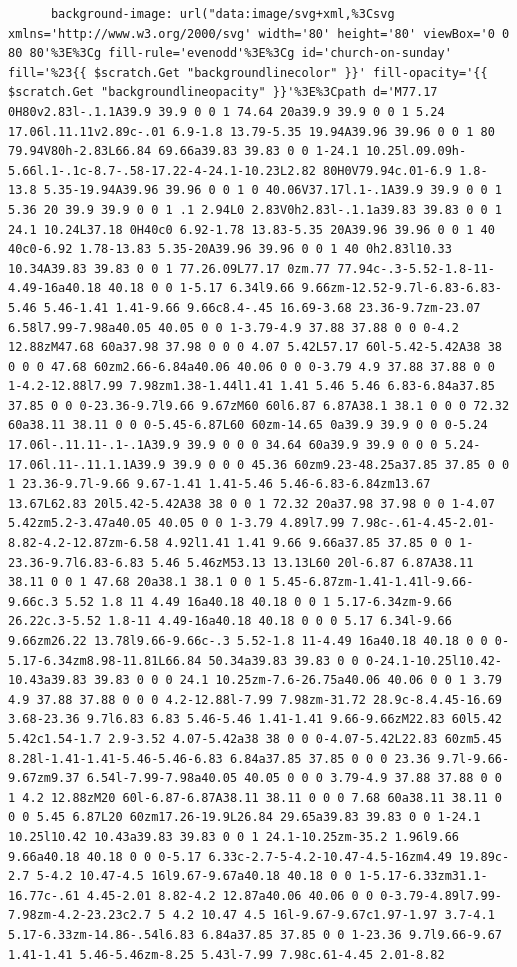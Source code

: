 \documentclass[11pt]{article}
\begin{document}
\begin{enumerate}
\begin{verbatim}
      background-image: url("data:image/svg+xml,%3Csvg xmlns='http://www.w3.org/2000/svg' width='80' height='80' viewBox='0 0 80 80'%3E%3Cg fill-rule='evenodd'%3E%3Cg id='church-on-sunday' fill='%23{{ $scratch.Get "backgroundlinecolor" }}' fill-opacity='{{ $scratch.Get "backgroundlineopacity" }}'%3E%3Cpath d='M77.17 0H80v2.83l-.1.1A39.9 39.9 0 0 1 74.64 20a39.9 39.9 0 0 1 5.24 17.06l.11.11v2.89c-.01 6.9-1.8 13.79-5.35 19.94A39.96 39.96 0 0 1 80 79.94V80h-2.83L66.84 69.66a39.83 39.83 0 0 1-24.1 10.25l.09.09h-5.66l.1-.1c-8.7-.58-17.22-4-24.1-10.23L2.82 80H0V79.94c.01-6.9 1.8-13.8 5.35-19.94A39.96 39.96 0 0 1 0 40.06V37.17l.1-.1A39.9 39.9 0 0 1 5.36 20 39.9 39.9 0 0 1 .1 2.94L0 2.83V0h2.83l-.1.1a39.83 39.83 0 0 1 24.1 10.24L37.18 0H40c0 6.92-1.78 13.83-5.35 20A39.96 39.96 0 0 1 40 40c0-6.92 1.78-13.83 5.35-20A39.96 39.96 0 0 1 40 0h2.83l10.33 10.34A39.83 39.83 0 0 1 77.26.09L77.17 0zm.77 77.94c-.3-5.52-1.8-11-4.49-16a40.18 40.18 0 0 1-5.17 6.34l9.66 9.66zm-12.52-9.7l-6.83-6.83-5.46 5.46-1.41 1.41-9.66 9.66c8.4-.45 16.69-3.68 23.36-9.7zm-23.07 6.58l7.99-7.98a40.05 40.05 0 0 1-3.79-4.9 37.88 37.88 0 0 0-4.2 12.88zM47.68 60a37.98 37.98 0 0 0 4.07 5.42L57.17 60l-5.42-5.42A38 38 0 0 0 47.68 60zm2.66-6.84a40.06 40.06 0 0 0-3.79 4.9 37.88 37.88 0 0 1-4.2-12.88l7.99 7.98zm1.38-1.44l1.41 1.41 5.46 5.46 6.83-6.84a37.85 37.85 0 0 0-23.36-9.7l9.66 9.67zM60 60l6.87 6.87A38.1 38.1 0 0 0 72.32 60a38.11 38.11 0 0 0-5.45-6.87L60 60zm-14.65 0a39.9 39.9 0 0 0-5.24 17.06l-.11.11-.1-.1A39.9 39.9 0 0 0 34.64 60a39.9 39.9 0 0 0 5.24-17.06l.11-.11.1.1A39.9 39.9 0 0 0 45.36 60zm9.23-48.25a37.85 37.85 0 0 1 23.36-9.7l-9.66 9.67-1.41 1.41-5.46 5.46-6.83-6.84zm13.67 13.67L62.83 20l5.42-5.42A38 38 0 0 1 72.32 20a37.98 37.98 0 0 1-4.07 5.42zm5.2-3.47a40.05 40.05 0 0 1-3.79 4.89l7.99 7.98c-.61-4.45-2.01-8.82-4.2-12.87zm-6.58 4.92l1.41 1.41 9.66 9.66a37.85 37.85 0 0 1-23.36-9.7l6.83-6.83 5.46 5.46zM53.13 13.13L60 20l-6.87 6.87A38.11 38.11 0 0 1 47.68 20a38.1 38.1 0 0 1 5.45-6.87zm-1.41-1.41l-9.66-9.66c.3 5.52 1.8 11 4.49 16a40.18 40.18 0 0 1 5.17-6.34zm-9.66 26.22c.3-5.52 1.8-11 4.49-16a40.18 40.18 0 0 0 5.17 6.34l-9.66 9.66zm26.22 13.78l9.66-9.66c-.3 5.52-1.8 11-4.49 16a40.18 40.18 0 0 0-5.17-6.34zm8.98-11.81L66.84 50.34a39.83 39.83 0 0 0-24.1-10.25l10.42-10.43a39.83 39.83 0 0 0 24.1 10.25zm-7.6-26.75a40.06 40.06 0 0 1 3.79 4.9 37.88 37.88 0 0 0 4.2-12.88l-7.99 7.98zm-31.72 28.9c-8.4.45-16.69 3.68-23.36 9.7l6.83 6.83 5.46-5.46 1.41-1.41 9.66-9.66zM22.83 60l5.42 5.42c1.54-1.7 2.9-3.52 4.07-5.42a38 38 0 0 0-4.07-5.42L22.83 60zm5.45 8.28l-1.41-1.41-5.46-5.46-6.83 6.84a37.85 37.85 0 0 0 23.36 9.7l-9.66-9.67zm9.37 6.54l-7.99-7.98a40.05 40.05 0 0 0 3.79-4.9 37.88 37.88 0 0 1 4.2 12.88zM20 60l-6.87-6.87A38.11 38.11 0 0 0 7.68 60a38.11 38.11 0 0 0 5.45 6.87L20 60zm17.26-19.9L26.84 29.65a39.83 39.83 0 0 1-24.1 10.25l10.42 10.43a39.83 39.83 0 0 1 24.1-10.25zm-35.2 1.96l9.66 9.66a40.18 40.18 0 0 0-5.17 6.33c-2.7-5-4.2-10.47-4.5-16zm4.49 19.89c-2.7 5-4.2 10.47-4.5 16l9.67-9.67a40.18 40.18 0 0 1-5.17-6.33zm31.1-16.77c-.61 4.45-2.01 8.82-4.2 12.87a40.06 40.06 0 0 0-3.79-4.89l7.99-7.98zm-4.2-23.23c2.7 5 4.2 10.47 4.5 16l-9.67-9.67c1.97-1.97 3.7-4.1 5.17-6.33zm-14.86-.54l6.83 6.84a37.85 37.85 0 0 1-23.36 9.7l9.66-9.67 1.41-1.41 5.46-5.46zm-8.25 5.43l-7.99 7.98c.61-4.45 2.01-8.82 
\end{verbatim}
\end{enumerate}
\end{document}
